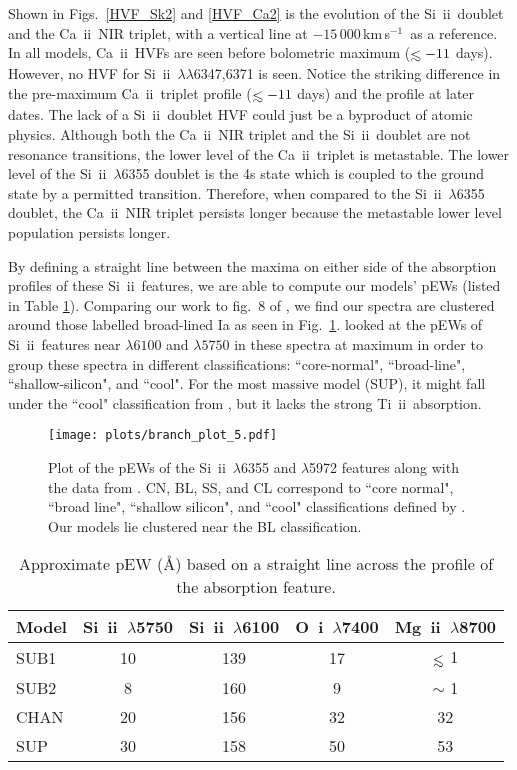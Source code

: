 \documentclass[useAMS,usenatbib,useasmath]{mnras}
\newcommand{\kms}{\hbox{km$\,$s$^{-1}$}}
\def\lesssim{\mathrel{\hbox{\rlap{\hbox{\lower4pt\hbox{$\sim$}}}\hbox{$<$}}}}
\newcommand{\caii}{\mbox{Ca~{\sc ii}}}
\newcommand{\oi}{\mbox{O~{\sc i}}}
\newcommand{\skii}{\mbox{Si~{\sc ii}}}
\newcommand{\tkii}{\mbox{Ti~{\sc ii}}}
\newcommand{\mgii}{\mbox{Mg~{\sc ii}}}
\newcommand{\lb}{$\lambda$}
\def\fig{Fig.}
\def\figs{Figs.}
\begin{document}
Shown in \figs~\ref{HVF_Sk2} and \ref{HVF_Ca2} is the evolution of the \skii\ doublet and the \caii\ NIR triplet, with a vertical line at $-15\,000$\,\kms\ as a reference. In all models, \caii\ HVFs are seen before bolometric maximum ($\lesssim-11$ days). However, no HVF for \skii\ \lb\lb6347,6371 is seen. Notice the striking difference in the  pre-maximum \caii\ triplet profile ($\lesssim -11$ days) and the profile at later dates.
The lack of a \skii\ doublet HVF could just be a byproduct of atomic physics. Although  both the \caii\ NIR triplet and the \skii\ doublet are not resonance transitions, the lower level of the \caii\ triplet is metastable. The lower level of the \skii\ \lb6355 doublet is the 4s state which is coupled to the ground state by a permitted transition. Therefore, when compared to the \skii\ \lb6355 doublet, the \caii\ NIR triplet persists longer because the metastable lower level population persists longer. 

By defining a straight line between the maxima on either side of the absorption profiles of these \skii\ features, we are able to compute our models' pEWs (listed in Table \ref{Sk2_widths}). Comparing our work to fig.~8 of \cite{Blondin2012}, we find our spectra are clustered around those labelled broad-lined Ia as seen in \fig~\ref{BranchTypes}. \cite{Branch2006} looked at the pEWs of \skii\ features near $\lambda 6100$ and $\lambda 5750$ in these spectra at maximum in order to group these spectra in different classifications: ``core-normal", ``broad-line", ``shallow-silicon", and ``cool". For the most massive model (SUP), it might fall under the ``cool" classification from \cite{Branch2006}, but it lacks the strong \tkii\ absorption.

\begin{figure} 
\texttt{[image: plots/branch\_plot\_5.pdf]}
\caption[]{Plot of the pEWs of the \skii\ $\lambda$6355 and $\lambda$5972 features along with the data from \cite{Blondin2012}. CN, BL, SS, and CL correspond to ``core normal", ``broad line", ``shallow silicon", and ``cool" classifications defined by \cite{Branch2006}. Our models lie clustered near the BL classification.}
\label{BranchTypes}
\end{figure}
\begin{table}
\centering
 \begin{tabular}{| l  | c | c | c | c |} 
 \hline
 Model & \skii\ \lb5750 & \skii\ \lb6100 & \oi\ \lb7400 & \mgii\ \lb8700 \\ [0.5ex] 
 \hline\hline
 SUB1 & 10 & 139 & 17 & $\lesssim$ 1 \\
 SUB2 & 8 & 160 & 9 & $\sim$ 1 \\ 
 CHAN & 20 & 156 & 32 & 32 \\
 SUP & 30 & 158 & 50 & 53 \\
 \hline
 \end{tabular}
\caption[]{Approximate pEW (\AA) based on a straight line across the profile of the absorption feature.}
\label{Sk2_widths}
\end{table}
\end{document}
